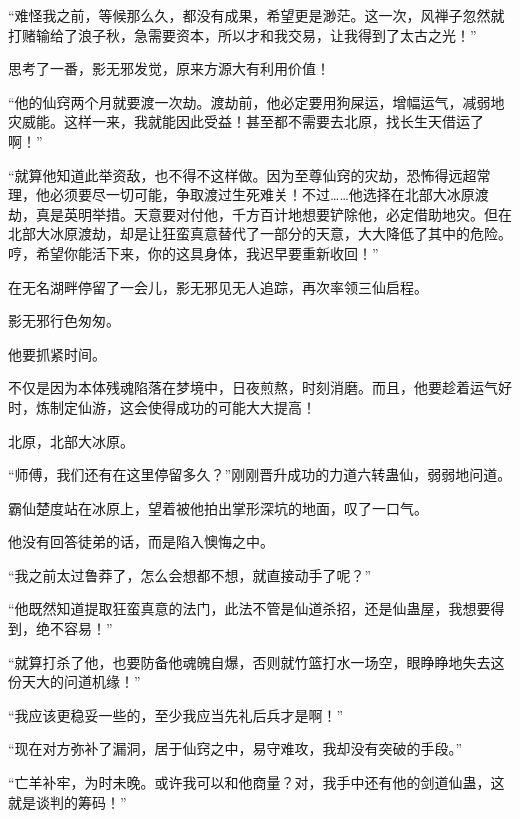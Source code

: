 \begin{this_body}
“难怪我之前，等候那么久，都没有成果，希望更是渺茫。这一次，风禅子忽然就打赌输给了浪子秋，急需要资本，所以才和我交易，让我得到了太古之光！”

思考了一番，影无邪发觉，原来方源大有利用价值！

“他的仙窍两个月就要渡一次劫。渡劫前，他必定要用狗屎运，增幅运气，减弱地灾威能。这样一来，我就能因此受益！甚至都不需要去北原，找长生天借运了啊！”

“就算他知道此举资敌，也不得不这样做。因为至尊仙窍的灾劫，恐怖得远超常理，他必须要尽一切可能，争取渡过生死难关！不过……他选择在北部大冰原渡劫，真是英明举措。天意要对付他，千方百计地想要铲除他，必定借助地灾。但在北部大冰原渡劫，却是让狂蛮真意替代了一部分的天意，大大降低了其中的危险。哼，希望你能活下来，你的这具身体，我迟早要重新收回！”

在无名湖畔停留了一会儿，影无邪见无人追踪，再次率领三仙启程。

影无邪行色匆匆。

他要抓紧时间。

不仅是因为本体残魂陷落在梦境中，日夜煎熬，时刻消磨。而且，他要趁着运气好时，炼制定仙游，这会使得成功的可能大大提高！

北原，北部大冰原。

“师傅，我们还有在这里停留多久？”刚刚晋升成功的力道六转蛊仙，弱弱地问道。

霸仙楚度站在冰原上，望着被他拍出掌形深坑的地面，叹了一口气。

他没有回答徒弟的话，而是陷入懊悔之中。

“我之前太过鲁莽了，怎么会想都不想，就直接动手了呢？”

“他既然知道提取狂蛮真意的法门，此法不管是仙道杀招，还是仙蛊屋，我想要得到，绝不容易！”

“就算打杀了他，也要防备他魂魄自爆，否则就竹篮打水一场空，眼睁睁地失去这份天大的问道机缘！”

“我应该更稳妥一些的，至少我应当先礼后兵才是啊！”

“现在对方弥补了漏洞，居于仙窍之中，易守难攻，我却没有突破的手段。”

“亡羊补牢，为时未晚。或许我可以和他商量？对，我手中还有他的剑道仙蛊，这就是谈判的筹码！”

\end{this_body}

